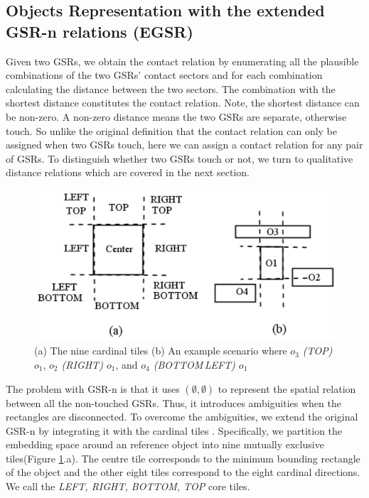 \documentclass[letterpaper]{article}
\begin{document}
\subsection{Objects Representation with the extended GSR-n relations (EGSR)}

Given two GSRs, we obtain the contact relation by enumerating all the plausible combinations of the two GSRs' contact sectors and for each combination calculating the distance between the two sectors. The combination with the shortest distance constitutes the contact relation. Note, the shortest distance can be non-zero. A non-zero distance means the two GSRs are separate, otherwise touch. So unlike the original definition that the contact relation can only be assigned when two GSRs touch, here we can assign a contact relation for any pair of GSRs. To distinguish whether two GSRs touch or not, we turn to qualitative distance relations which are covered in the next section.

\begin{figure}[t!]
\centering\includegraphics[scale=0.30]{CardinalTiles.png}\caption{(a) The nine cardinal tiles (b) An example scenario where \emph{$o_3$ (TOP) $o_1$}, \emph{$o_2$ (RIGHT) $o_1$}, and \emph{$o_4$ (BOTTOM\,LEFT) $o_1$}}
\label{CardinalTile}
\vspace{-1mm}
\end{figure}


The problem with GSR-n is that it uses $(\emptyset, \emptyset)$ to represent the spatial relation between all the non-touched GSRs. Thus, it introduces ambiguities when the rectangles are disconnected. To overcome the ambiguities, we extend the original GSR-n by integrating it with the cardinal tiles \cite{goyal1997direction}. Specifically, we partition the embedding space around an reference object into nine mutually exclusive tiles(Figure \ref{CardinalTile}.a). The centre tile corresponds to the minimum bounding rectangle of the object and the other eight tiles correspond to the eight cardinal directions. We call the \emph{LEFT, RIGHT, BOTTOM, TOP} core tiles.  
\end{document}
